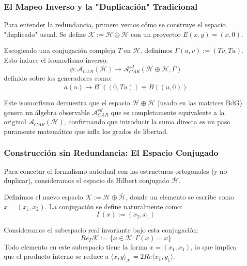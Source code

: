 
\begin{frame}
  \frametitle{El Mapeo Inverso y la "Duplicación" Tradicional}
  
  Para entender la redundancia, primero vemos cómo se construye el espacio "duplicado" usual. Se define $\mathcal{K} := \mathcal{H} \oplus \mathcal{H}$ con un proyector $E(x,y) = (x,0)$. 
  
  Escogiendo una conjugación compleja $T$ en $\mathcal{H}$, definimos $\Gamma(u,v) := (Tv, Tu)$. Esto induce el isomorfismo inverso:
  \begin{equation}
      \phi: \mathcal{A}_{CAR}(\mathcal{H}) \longrightarrow \mathcal{A}_{CAR}^{sd}(\mathcal{H} \oplus \mathcal{H}, \Gamma)
  \end{equation}
  definido sobre los generadores como:
  \begin{equation}
      a(u) \mapsto B^{\dagger}((0, Tu)) \equiv B((u, 0))
      \label{eq:III.11}
  \end{equation}
  
  \vspace{0.2cm}
  Este isomorfismo demuestra que el espacio $\mathcal{H} \oplus \mathcal{H}$ (usado en las matrices BdG) genera un álgebra observable $\mathcal{A}_{CAR}^{sd}$ que es completamente equivalente a la original $\mathcal{A}_{CAR}(\mathcal{H})$, confirmando que introducir la suma directa es un paso puramente matemático que infla los grados de libertad.
\end{frame}

\begin{frame}
  \frametitle{Construcción sin Redundancia: El Espacio Conjugado}

  Para conectar el formalismo autodual con las estructuras ortogonales (y no duplicar), consideramos el espacio de Hilbert conjugado $\overline{\mathcal{H}}$. 
  
  Definimos el nuevo espacio $\mathcal{K} := \mathcal{H} \oplus \overline{\mathcal{H}}$, donde un elemento se escribe como $x = (x_1, x_2)$. La conjugación se define naturalmente como:
  \begin{equation}
      \Gamma(x) := (x_2, x_1)
      \label{eq:III.12}
  \end{equation}
  
  Consideramos el subespacio real invariante bajo esta conjugación:
  \begin{equation}
      Re_\Gamma \mathcal{K} := \{x \in \mathcal{K} : \Gamma(x) = x\}
  \end{equation}
  Todo elemento en este subespacio tiene la forma $x = (x_1, x_1)$, lo que implica que el producto interno se reduce a $\langle x, y \rangle_{\mathcal{K}} = 2 Re\langle x_1, y_1 \rangle$.
\end{frame}

